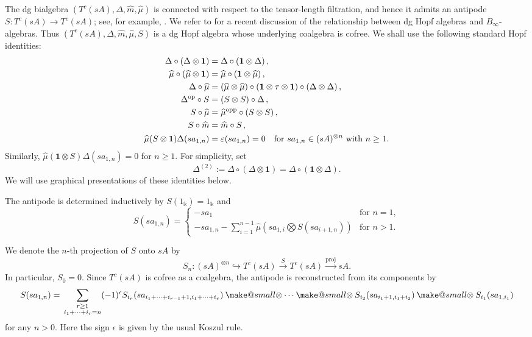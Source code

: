 \documentclass[a4paper, 11pt]{amsart}
\makeatletter
\theoremstyle{definition}
\theoremstyle{remark}
\numberwithin{equation}{section}
\newcommand{\op}{\mathrm{op}}
\newcommand{\opp}{\mathrm{opp}}
\newcommand{\id}{\mathbf{1}}
\newcommand{\smallotimes}{\mathbin{\mathpalette\make@small\otimes}}
\newcommand{\make@small}[2]{%
  \vcenter{\hbox{%
    $\m@th\ifx#1\displaystyle\scriptstyle\else\ifx#1\textstyle\scriptstyle
     \else\scriptscriptstyle\fi\fi#2$%
  }}%
}
\makeatother
\begin{document}
The dg bialgebra $(T^c(sA),\Delta,\widehat m,\widehat\mu)$ is connected with respect to the tensor-length filtration, and hence it admits an antipode
$S\colon T^c(sA)\to T^c(sA)$; see, for example, \cite[Theorem 5.10]{CLW}. We refer to \cite{GRT} for a recent discussion of the relationship between dg Hopf algebras and $B_\infty$-algebras.
Thus $(T^c(sA),\Delta,\widehat m,\widehat\mu,S)$ is a dg Hopf algebra whose underlying coalgebra is cofree. We shall use the following standard Hopf identities:
\begin{align}
\Delta\circ (\Delta\otimes \id) & =\Delta \circ (\id\otimes \Delta) \, ,\label{coassociativity}\\
\widehat{\mu}\circ (\widehat{\mu}\otimes \id) & =\widehat{\mu}\circ (\id\otimes \widehat{\mu}) \, ,\label{associativity}\\
\qquad\Delta \circ \widehat{\mu}& = (\widehat{\mu}\otimes \widehat{\mu})\circ(\id\otimes \tau\otimes \id)\circ(\Delta\otimes \Delta) \, , \label{Delta:algebramorphism} \\
 \Delta^{\op} \circ S &= (S\otimes S)\circ \Delta \, , \label{S:anti-coalg} \\
S\circ \widehat{\mu} & =\widehat{\mu}^{\opp} \circ (S\otimes S) \, , \label{S:anti-alg}\\
S\circ \widehat{m} & =\widehat{m}\circ S\, , \label{S:differential}\\
 \widehat{\mu}(S\otimes \id) \Delta (sa_{1,n}) &= \varepsilon(sa_{1,n})=0 \quad \text{for $ sa_{1,n}\in (sA)^{\otimes n}$ with $n\geq$ 1}.\label{S:antipodeaxiom}
\end{align}
Similarly, $\widehat{\mu}(\id\otimes S)\Delta(sa_{1,n})=0$ for $n\geq 1$.
For simplicity, set
\[
\Delta^{(2)}:=\Delta\circ(\Delta\otimes\id)=\Delta\circ(\id\otimes\Delta).
\]
We will use graphical presentations of these identities below.


The antipode is determined inductively by $S(1_\Bbbk)=1_\Bbbk$ and
\[S(sa_{1,n})=\begin{cases}
-sa_1 & \text{for $n=1,$}\\
-sa_{1,n} -\sum\limits_{i=1}^{n-1} \widehat{\mu} (sa_{1,i} \bigotimes S(sa_{i+1,n})) & \text{for $n>1.$}
\end{cases}
\]


We denote the $n$-th projection of $S$ onto $sA$ by
\[
S_n \colon (sA)^{\otimes n} \hookrightarrow T^c(sA) \xrightarrow{S} T^c(sA) \xrightarrow{\mathrm{proj}} sA.
\]
In particular, $S_0=0$. Since $T^c(sA)$ is cofree as a coalgebra, the antipode is reconstructed from its components by
\begin{align*}
S(sa_{1,n}) ={} \sum_{\substack{r\geq 1\\ i_1+\dotsb + i_r=n}} (-1)^{\epsilon} S_{i_r}( sa_{i_1+\dotsb+i_{r-1}+1, i_1+\dotsb+i_{r}}) \smallotimes \dotsb\smallotimes S_{i_2}(sa_{i_1+1, i_1+i_2}) \smallotimes S_{i_1} (sa_{1,i_1})
\end{align*}
for any $n>0$. Here the sign $\epsilon$ is given by the usual Koszul rule.
\end{document}
